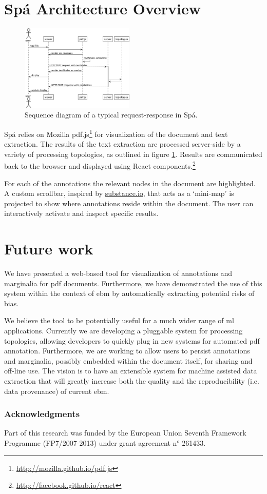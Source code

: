\documentclass[runningheads,a4paper]{llncs}
\begin{document}
\section{Spá Architecture Overview}

\label{section:architecture}
\begin{figure}
  \vspace{-2em}
  \includegraphics[width=0.48\textwidth]{./diagrams/sequence.pdf}
  \vspace{-1em}
  \caption{\label{fig:sequence}Sequence diagram of a typical request-response in Spá.}
  \vspace{-1.5em}
\end{figure}

Spá relies on Mozilla pdf.js\footnote{\url{http://mozilla.github.io/pdf.js}} for visualization of the document and text extraction.
The results of the text extraction are processed server-side by a variety of processing topologies, as outlined in figure \ref{fig:sequence}.
Results are communicated back to the browser and displayed using React components.\footnote{\url{http://facebook.github.io/react}}

For each of the annotations the relevant nodes in the document are highlighted.
A custom scrollbar, inspired by \href{http://substance.io/}{substance.io}, that acts as a `mini-map' is projected to show where annotations reside within the document.
The user can interactively activate and inspect specific results.

\section{Future work}
We have presented a web-based tool for visualization of annotations and marginalia for \ac{pdf} documents.
Furthermore, we have demonstrated the use of this system within the context of \acl{ebm} by automatically extracting potential risks of bias.

We believe the tool to be potentially useful for a much wider range of \acl{ml} applications.
Currently we are developing a pluggable system for processing topologies, allowing developers to quickly plug in new systems for automated \ac{pdf} annotation.
Furthermore, we are working to allow users to persist annotations and marginalia, possibly embedded within the document itself, for sharing and off-line use.
The vision is to have an extensible system for machine assisted data extraction that will greatly increase both the quality and the reproducibility (i.e. data provenance) of current \acl{ebm}.

\subsubsection{Acknowledgments}
Part of this research was funded by the European Union Seventh Framework Programme (FP7/2007-2013) under grant agreement n° 261433. %




\end{document}
